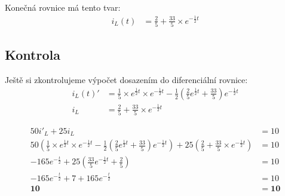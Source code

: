Konečná rovnice má tento tvar:
\begin{align*}
	i_L(t) & = \frac{2}{5} + \frac{33}{5} \times e^{-\frac{1}{2} t}
\end{align*}

\subsection{Kontrola}

Ještě si zkontrolujeme výpočet dosazením do diferenciální rovnice:
\begin{align*}
	i_L(t)'&= \frac{1}{5}\times e^{\frac{1}{2}t}\times e^{-\frac{1}{2}t} - \frac{1}{2}\left(\frac{2}{5} e^{\frac{1}{2}t} + \frac{33}{5}\right)e^{-\frac{1}{2}t}\\
	i_L &= \frac{2}{5} + \frac{33}{5} \times e^{-\frac{1}{2} t}
\end{align*}

\begin{align*}
	50i'_L + 25i_L&=10 \\
	50\left(\frac{1}{5}\times e^{\frac{1}{2}t}\times e^{-\frac{1}{2}t} - \frac{1}{2}\left(\frac{2}{5} e^{\frac{1}{2}t} + \frac{33}{5}\right)e^{-\frac{1}{2}t}\right) + 25\left(\frac{2}{5} + \frac{33}{5} \times e^{-\frac{1}{2} t}\right) & = 10\\
	-165e^{-\frac{t}{2}}+25\left(\frac{33}{5}e^{-\frac{1}{2}t}+\frac{2}{5}\right)&=10 \\
	-165e^{-\frac{t}{2}}+7+165e^{-\frac{t}{2}}&=10 \\
	\boldsymbol{10}&\boldsymbol{=10}
\end{align*}